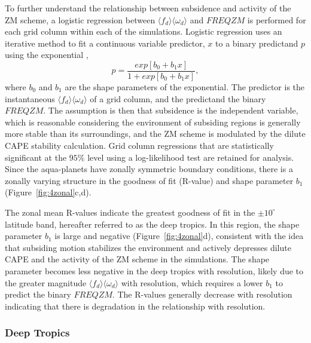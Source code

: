 \documentclass[times]{qjrms4}
\begin{document}
To further understand the relationship between subsidence and activity of the ZM scheme, a logistic regression between $\langle f_{d} \rangle \langle \omega_{d} \rangle$ and $FREQZM$ is performed for each grid column within each of the simulations. Logistic regression uses an iterative method to fit a continuous variable predictor, $x$ to a binary predictand $p$ using the exponential \citep{WILKSBOOK},
\begin{equation}
p = \frac{exp{[b_0 + b_1 x]}}{1 + exp{[b_0 + b_1 x]}}, \label{eq:logreg}
\end{equation}
where $b_0$ and $b_1$ are the shape parameters of the exponential. The predictor is the instantaneous $\langle f_{d} \rangle \langle \omega_{d} \rangle$ of a grid column, and the predictand the binary $FREQZM$. The assumption is then that subsidence is the independent variable, which is reasonable considering the environment of subsiding regions is generally more stable than its surroundings, and the ZM scheme is modulated by the dilute CAPE stability calculation. Grid column regressions that are statistically significant at the $95\%$ level using a log-likelihood test \citep{WILKSBOOK} are retained for analysis. Since the aqua-planets have zonally symmetric boundary conditions, there is a zonally varying structure in the goodness of fit (R-value) and shape parameter $b_1$ (Figure~\ref{fig:4zonal}c,d).

The zonal mean R-values indicate the greatest goodness of fit in the $\pm 10^{\circ}$ latitude band, hereafter referred to as the deep tropics. In this region, the shape parameter $b_1$ is large and negative (Figure~\ref{fig:4zonal}d), consistent with the idea that subsiding motion stabilizes the environment and actively depresses dilute CAPE and the activity of the ZM scheme in the simulations. The shape parameter becomes less negative in the deep tropics with resolution, likely due to the greater magnitude $\langle f_{d} \rangle \langle \omega_{d} \rangle$ with resolution, which requires a lower $b_1$ to predict the binary $FREQZM$. The R-values generally decrease with resolution indicating that there is degradation in the relationship with resolution.

\subsubsection{Deep Tropics}
\end{document}
